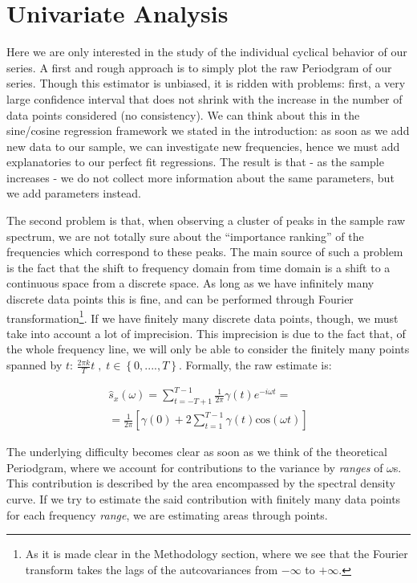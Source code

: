 \documentclass[12pt]{article} %
\begin{document}
\newpage

\section{Univariate Analysis}

Here we are only interested in the study of the individual cyclical behavior of our series. A first and rough approach is to simply plot the raw Periodgram of our series. Though this estimator is unbiased, it is ridden with problems: first, a very large confidence interval that does not shrink with the increase in the number of data points considered (no consistency). We can think about this in the sine/cosine regression framework we stated in the introduction: as soon as we add new data to our sample, we can investigate new frequencies, hence we must add explanatories to our perfect fit regressions.  The result is that - as the sample increases - we do not collect more information about the same parameters, but we add parameters instead.

The second problem is that, when observing a cluster of peaks in the sample raw spectrum, we are not totally sure about the ``importance ranking'' of the frequencies which correspond to these peaks. The main source of such a problem is the fact that the shift to frequency domain from time domain is a shift to a continuous space from a discrete space. As long as we have infinitely many discrete data points this is fine, and can be performed through Fourier transformation\footnote{As it is made clear in the Methodology section, where we see that the Fourier transform takes the lags of the autcovariances from $-\infty$ to $+\infty$.}. If we have finitely many discrete data points, though, we must take into account a lot of imprecision. This imprecision is due to the fact that, of the whole frequency line, we will only be able to consider the finitely many points spanned by $t$: $\frac{2\pi k}{T}t\;,\;t\in\left\{0,....,T\right\}$. Formally, the raw estimate is:

\begin{equation}
\begin{aligned}
\hat{s}_x(\omega)=\sum\limits_{t=-T+1}^{T-1} \frac{1}{2\pi} \gamma(t)e^{-i\omega t}=\\
=\frac{1}{2\pi}\left[\gamma(0)+2\sum\limits_{t=1}^{T-1} \gamma(t)\text{cos}(\omega t)\right]
\end{aligned}
\end{equation}

The underlying difficulty becomes clear as soon as we think of the theoretical Periodgram, where we account for contributions to the variance by {\em ranges} of $\omega$s. This contribution is described by the area encompassed by the spectral density curve. If we try to estimate the said contribution with finitely many data points for each frequency {\em range}, we are estimating areas through points.
\end{document}
